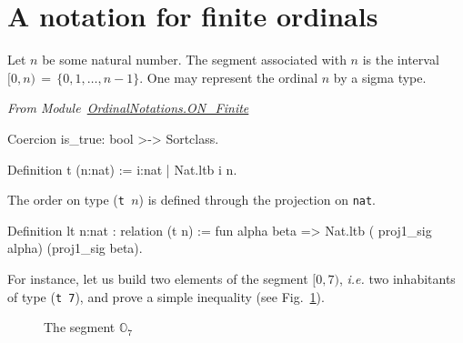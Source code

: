 
  


\section{A notation for finite ordinals}


Let $n$ be some natural number. The segment associated with $n$ is the interval 
$[0,n)\,=\,\{0,1,\dots,n-1\}$. 
One may represent the ordinal $n$ by a sigma type.


\vspace{4pt}
\noindent\emph{From Module~\href{../theories/html/hydras.OrdinalNotations.ON_Finite.html}{OrdinalNotations.ON\_Finite}}

\label{def: Finite-ord-type}
\begin{Coqsrc}
Coercion is_true: bool >-> Sortclass.

Definition t (n:nat) := {i:nat | Nat.ltb i n}.
\end{Coqsrc}

The order on type (\texttt{t $n$}) is defined through the projection on \texttt{nat}.


\begin{Coqsrc}
Definition lt {n:nat} : relation (t n) :=
  fun alpha beta => Nat.ltb ( proj1_sig alpha) (proj1_sig beta).
\end{Coqsrc}

For instance, let us build two elements of the segment $[0, 7)$, \emph{i.e.} two
inhabitants of   type (\texttt{t 7}), and prove a simple  inequality (see Fig.~\ref{fig:O7}).

\begin{figure}[h]
\centering
{}

\caption{The segment $\mathbb{O}_7$\label{fig:O7}}
\end{figure}
  
